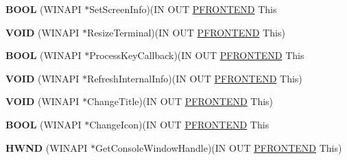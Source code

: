 \begin{DoxyCompactItemize}
\mbox{\label{struct___f_r_o_n_t_e_n_d___v_t_b_l_a3e0f4134bd5d24f3c99efa6d59b3a358}} 
{\bfseries B\+O\+OL} (W\+I\+N\+A\+PI $\ast$Set\+Screen\+Info)(IN O\+UT \hyperlink{struct___f_r_o_n_t_e_n_d}{P\+F\+R\+O\+N\+T\+E\+ND} This
\item 
\mbox{\label{struct___f_r_o_n_t_e_n_d___v_t_b_l_ae0cf653e02a54d70a759a316671265dc}} 
{\bfseries V\+O\+ID} (W\+I\+N\+A\+PI $\ast$Resize\+Terminal)(IN O\+UT \hyperlink{struct___f_r_o_n_t_e_n_d}{P\+F\+R\+O\+N\+T\+E\+ND} This)
\item 
\mbox{\label{struct___f_r_o_n_t_e_n_d___v_t_b_l_a26ade996806135907ea9dc7be23f9867}} 
{\bfseries B\+O\+OL} (W\+I\+N\+A\+PI $\ast$Process\+Key\+Callback)(IN O\+UT \hyperlink{struct___f_r_o_n_t_e_n_d}{P\+F\+R\+O\+N\+T\+E\+ND} This
\item 
\mbox{\label{struct___f_r_o_n_t_e_n_d___v_t_b_l_ab350e355359ea65d7434203da36735ee}} 
{\bfseries V\+O\+ID} (W\+I\+N\+A\+PI $\ast$Refresh\+Internal\+Info)(IN O\+UT \hyperlink{struct___f_r_o_n_t_e_n_d}{P\+F\+R\+O\+N\+T\+E\+ND} This)
\item 
\mbox{\label{struct___f_r_o_n_t_e_n_d___v_t_b_l_a7b1dc9b8be1bf1b79d1488b3ddf0e9d6}} 
{\bfseries V\+O\+ID} (W\+I\+N\+A\+PI $\ast$Change\+Title)(IN O\+UT \hyperlink{struct___f_r_o_n_t_e_n_d}{P\+F\+R\+O\+N\+T\+E\+ND} This)
\item 
\mbox{\label{struct___f_r_o_n_t_e_n_d___v_t_b_l_a694cc1208012fe394fb1a888f1f95084}} 
{\bfseries B\+O\+OL} (W\+I\+N\+A\+PI $\ast$Change\+Icon)(IN O\+UT \hyperlink{struct___f_r_o_n_t_e_n_d}{P\+F\+R\+O\+N\+T\+E\+ND} This
\item 
\mbox{\label{struct___f_r_o_n_t_e_n_d___v_t_b_l_a8873967ff29722a22c29d4ff371306e9}} 
{\bfseries H\+W\+ND} (W\+I\+N\+A\+PI $\ast$Get\+Console\+Window\+Handle)(IN O\+UT \hyperlink{struct___f_r_o_n_t_e_n_d}{P\+F\+R\+O\+N\+T\+E\+ND} This)
\item 
\mbox{\label{struct___f_r_o_n_t_e_n_d___v_t_b_l_aec1ee28934e37ffe098111461b2723df}} 

\end{DoxyCompactItemize}
